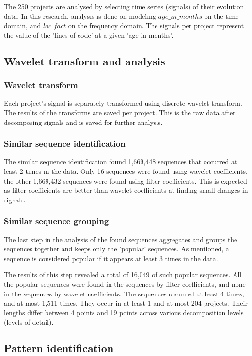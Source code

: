 The 250 projects are analysed by selecting time series (signals) of their
evolution data. In this research, analysis is done on modeling $age\_in\_months$
on the time domain, and $loc\_fact$ on the frequency domain. The signals per
project represent the value of the 'lines of code' at a given 'age in months'.

\subsection{Wavelet transform and analysis}

\subsubsection{Wavelet transform}
Each project's signal is separately transformed using discrete wavelet
transform. The results of the transforms are saved per project. This is the raw
data after decomposing signals and is saved for further analysis.

\subsubsection{Similar sequence identification}
The similar sequence identification found 1,669,448 sequences that occurred
at least 2 times in the data. Only 16 sequences were found using wavelet
coefficients, the other 1,669,432 sequences were found using filter
coefficients. This is expected as filter coefficients are better than wavelet
coefficients at finding small changes in signals.

\subsubsection{Similar sequence grouping}
The last step in the analysis of the found sequences aggregates and groups the
sequences together and keeps only the 'popular' sequences. As mentioned, a
sequence is considered popular if it appears at least 3 times in the data.

The results of this step revealed a total of 16,049 of such popular sequences.
All the popular sequences were found in the sequences by filter coefficients,
and none in the sequences by wavelet coefficients. The sequences occurred at
least 4 times, and at most 1,511 times. They occur in at least 1 and at most 204
projects. Their lengths differ between 4 points and 19 points across various
decomposition levels (levels of detail).

\subsection{Pattern identification}



